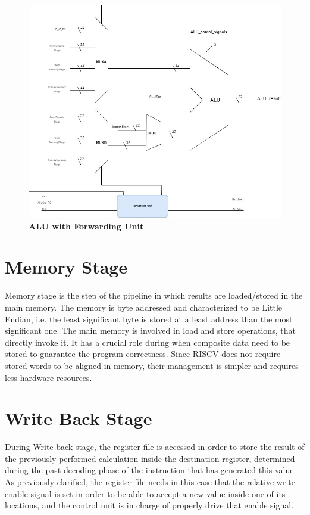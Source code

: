 \begin{figure}[!h]
    \centering
        \includegraphics[width=\linewidth]{schematic/ALUwithForwardingUnit.jpg}
        \caption{\textbf{ALU with Forwarding Unit}}
\end{figure}
    

\section{Memory Stage}

Memory stage is the step of the pipeline in which results are loaded/stored in the main memory.
The memory is byte addressed and characterized to be Little Endian, i.e. the least significant byte is stored at a least address than the most significant one.
The main memory is involved in load and store operations, that directly invoke it. It has a crucial role during when composite data need to be stored to guarantee 
the program correctness.
Since RISCV does not require stored words to be aligned in memory, their management is simpler and requires less hardware resources.

\section{Write Back Stage}

During Write-back stage, the register file is accessed in order to store the result of the previously performed calculation inside the destination register,
determined during the past decoding phase of the instruction that has generated this value.
As previously clarified, the register file needs in this case that the relative write-enable signal is set in order to be able to accept a new value inside one 
of its locations, and the control unit is in charge of properly drive that enable signal.